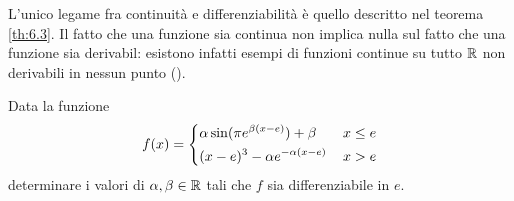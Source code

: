 \begin{remark}
    L'unico legame fra continuità e differenziabilità è quello descritto nel teorema \ref{th:6.3}. Il fatto che una funzione sia continua non implica nulla sul fatto che una funzione sia derivabil: esistono infatti esempi di funzioni continue su tutto $\amsbb{R}$ non derivabili in nessun punto (\cite[Teorema 7.18]{rudin1976principles}).
\end{remark}
\begin{exercise}
    \label{ex:6.2}
    Data la funzione
    \[
    f(x) = \begin{dcases}
        \alpha\sin(\pi e^{\beta(x-e)})+\beta\, & x\le e\\
        (x-e)^3-\alpha e^{-\alpha(x-e)}\, & x>e
    \end{dcases}
    \]
    determinare i valori di $\alpha, \beta\in\amsbb{R}$ tali che $f$ sia differenziabile in $e$.
\end{exercise}

